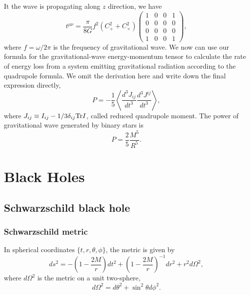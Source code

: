 It the wave is propagating along $z$ direction, we have
\[t^{\mu\nu} = \frac{\pi}{8G} f^2(C_{+}^2 + C_{\times}^2) \begin{pmatrix}
1 & 0 & 0 & 1 \\
0 & 0 & 0 & 0 \\
0 & 0 & 0 & 0 \\
1 & 0 & 0 & 1 
\end{pmatrix}, \]
where $f = \omega / 2\pi$ is the frequency of gravitational wave.
We now can use our formula for the gravitational-wave energy-momentum tensor to calculate the rate of energy loss from a system emitting gravitational radiation
according to the quadrupole formula. We omit the derivation here and write down the final expression directly,
\[P = -\frac{1}{5}\left\langle \frac{d^3 J_{ij}}{dt^3} \frac{d^3 J^{ij}}{dt^3}  \right\rangle,  \]
where $J_{ij} \equiv I_{ij} - 1/3 \delta_{ij} {\rm Tr}I$, called reduced quadrupole moment. The power of gravitational wave generated by binary stars is
\[P = \frac{2}{5} \frac{M^5}{R^5}.\]

\chapter{Black Holes}
\section{Schwarzschild black hole}
\subsection{Schwarzschild metric}
In spherical coordinates $\{t,r,\theta,\phi\}$, the metric is given by
\[ds^2 = -\left(1 - \frac{2M}{r} \right)dt^2 + \left(1 - \frac{2M}{r} \right)^{-1}dr^2 + r^2 d\Omega^2,\]
where $d\Omega^2$ is the metric on a unit two-sphere,
\[d\Omega^2 = d\theta^2 + \sin^2\theta d\phi^2.\]

